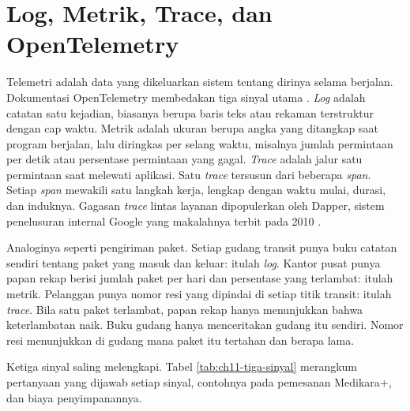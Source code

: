 \section{Log, Metrik, Trace, dan OpenTelemetry}
\label{sec:ch11-telemetri}

Telemetri adalah data yang dikeluarkan sistem tentang dirinya selama berjalan. Dokumentasi
OpenTelemetry membedakan tiga sinyal utama \cite{c11-otel-signals}. \textit{Log} adalah catatan
satu kejadian, biasanya berupa baris teks atau rekaman terstruktur dengan cap waktu. Metrik adalah
ukuran berupa angka yang ditangkap saat program berjalan, lalu diringkas per selang waktu, misalnya
jumlah permintaan per detik atau persentase permintaan yang gagal. \textit{Trace} adalah jalur satu
permintaan saat melewati aplikasi. Satu \textit{trace} tersusun dari beberapa \textit{span}. Setiap
\textit{span} mewakili satu langkah kerja, lengkap dengan waktu mulai, durasi, dan induknya.
Gagasan \textit{trace} lintas layanan dipopulerkan oleh Dapper, sistem penelusuran internal Google
yang makalahnya terbit pada 2010 \cite{c11-sigelman2010}.

Analoginya seperti pengiriman paket. Setiap gudang transit punya buku catatan sendiri tentang
paket yang masuk dan keluar: itulah \textit{log}. Kantor pusat punya papan rekap berisi jumlah paket
per hari dan persentase yang terlambat: itulah metrik. Pelanggan punya nomor resi yang dipindai di
setiap titik transit: itulah \textit{trace}. Bila satu paket terlambat, papan rekap hanya
menunjukkan bahwa keterlambatan naik. Buku gudang hanya menceritakan gudang itu sendiri. Nomor
resi menunjukkan di gudang mana paket itu tertahan dan berapa lama.

Ketiga sinyal saling melengkapi. Tabel \ref{tab:ch11-tiga-sinyal} merangkum pertanyaan yang
dijawab setiap sinyal, contohnya pada pemesanan Medikara+, dan biaya penyimpanannya.

